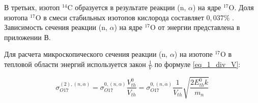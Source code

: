 В третьих, изотоп $^{14}\text{C}$ образуется в результате реакции (n, $\alpha$) на ядре $^{17}\text{O}$. Доля изотопа 
$^{17}\text{O}$ в смеси стабильных изотопов кислорода составляет $0,037 \%$ \cite{hoefs_oxygen_isotopes}. Зависимость 
сечения реакции (n, $\alpha$) на ядре $^{17}\text{O}$ от энергии представлена в приложении В.

Для расчета микроскопического сечения реакции (n, $\alpha$) на изотопе $^{17}\text{O}$ в тепловой области энергий 
используется закон $\frac{1}{V}$ по формуле \ref{eq_1_div_V}:

\begin{equation}
    \label{eq_1_div_V}
    \sigma_{O17}^{(2), (n, \alpha)} = \sigma_{O17}^{0, (n, \alpha)} \frac{V_{th}^0}{V_{th}} = 
        \sigma_{O17}^{0, (n, \alpha)} \frac{1}{V_{th}} \sqrt{\frac{2 E_{th}^{0} k}{m_{n}}}
\end{equation}

